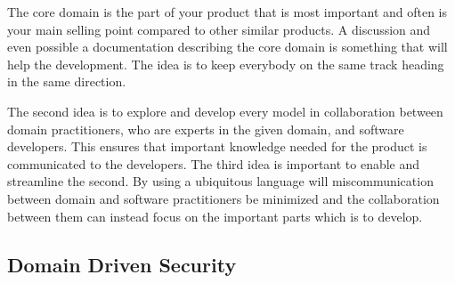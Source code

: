 The core domain is the part of your product that is most important and often is your main selling point compared to other similar products. \parencite{millett_2015} A discussion and even possible a documentation describing the core domain is something that will help the development. The idea is to keep everybody on the same track heading in the same direction. \parencite{EvansEric2004Dd:t}

The second idea is to explore and develop every model in collaboration between domain practitioners, who are experts in the given domain, and software developers. This ensures that important knowledge needed for the product is communicated to the developers. \parencite{millett_2015} The third idea is important to enable and streamline the second. By using a ubiquitous language will miscommunication between domain and software practitioners be minimized and the collaboration between them can instead focus on the important parts which is to develop.  \parencite{evans_2015}
 
\subsection{Domain Driven Security}


